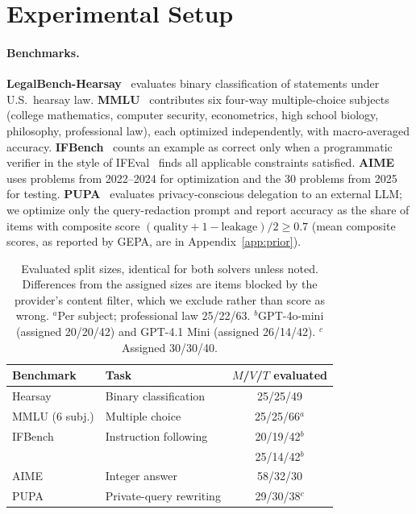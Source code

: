 \documentclass[11pt]{article}
\begin{document}
\section{Experimental Setup}
\label{sec:setup}

\paragraph{Benchmarks.}
\textbf{LegalBench-Hearsay}~\citep{guha2023legalbench} evaluates binary classification of statements under U.S.\ hearsay law. \textbf{MMLU}~\citep{hendrycks2021mmlu} contributes six four-way multiple-choice subjects (college mathematics, computer security, econometrics, high school biology, philosophy, professional law), each optimized independently, with macro-averaged accuracy. \textbf{IFBench}~\citep{pyatkin2025ifbench} counts an example as correct only when a programmatic verifier in the style of IFEval~\citep{zhou2023ifeval} finds all applicable constraints satisfied. \textbf{AIME}~\citep{maa2025aime} uses problems from 2022--2024 for optimization and the 30 problems from 2025 for testing. \textbf{PUPA}~\citep{li2025papillon} evaluates privacy-conscious delegation to an external LLM; we optimize only the query-redaction prompt and report accuracy as the share of items with composite score $(\mathrm{quality}+1-\mathrm{leakage})/2 \geq 0.7$ (mean composite scores, as reported by GEPA, are in Appendix~\ref{app:prior}).

\begin{table}[!t]
\centering
\small
\setlength{\tabcolsep}{4pt}
\begin{tabular}{llc}
\toprule
\rowcolor{midblue}
Benchmark & Task & $M$/$V$/$T$ evaluated \\
\midrule
Hearsay & Binary classification & 25/25/49 \\
MMLU (6 subj.) & Multiple choice & 25/25/66$^{a}$ \\
IFBench & Instruction following & 20/19/42$^{b}$ \\
 & & 25/14/42$^{b}$ \\
AIME & Integer answer & 58/32/30 \\
PUPA & Private-query rewriting & 29/30/38$^{c}$ \\
\bottomrule
\end{tabular}
\caption{Evaluated split sizes, identical for both solvers unless noted. Differences from the assigned sizes are items blocked by the provider's content filter, which we exclude rather than score as wrong. $^{a}$Per subject; professional law 25/22/63. $^{b}$GPT-4o-mini (assigned 20/20/42) and GPT-4.1 Mini (assigned 26/14/42). $^{c}$Assigned 30/30/40.}
\label{tab:setup}
\end{table}
\end{document}
